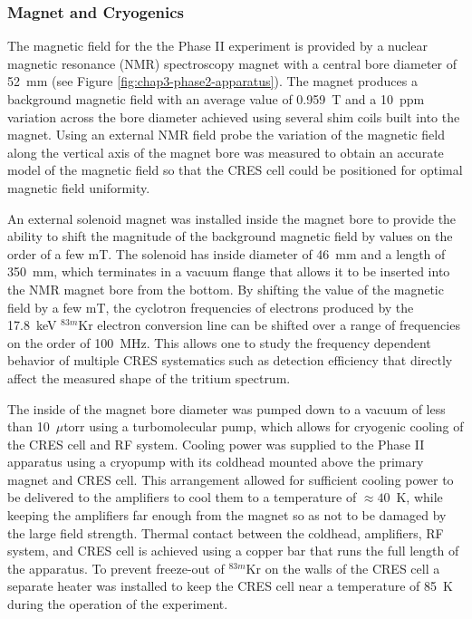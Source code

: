 \subsubsection*{Magnet and Cryogenics}

The magnetic field for the the Phase II experiment is provided by a nuclear magnetic resonance (NMR) spectroscopy magnet with a central bore diameter of 52~mm (see Figure \ref{fig:chap3-phase2-apparatus}). The magnet produces a background magnetic field with an average value of 0.959~T and a 10~ppm variation across the bore diameter achieved using several shim coils built into the magnet. Using an external NMR field probe the variation of the magnetic field along the vertical axis of the magnet bore was measured to obtain an accurate model of the magnetic field so that the CRES cell could be positioned for optimal magnetic field uniformity.

An external solenoid magnet was installed inside the magnet bore to provide the ability to shift the magnitude of the background magnetic field by values on the order of a few mT. The solenoid has inside diameter of 46~mm and a length of 350~mm, which terminates in a vacuum flange that allows it to be inserted into the NMR magnet bore from the bottom. By shifting the value of the magnetic field by a few mT, the cyclotron frequencies of electrons produced by the 17.8~keV $^{83m}$Kr electron conversion line can be shifted over a range of frequencies on the order of 100~MHz. This allows one to study the frequency dependent behavior of multiple CRES systematics such as detection efficiency that directly affect the measured shape of the tritium spectrum. 

The inside of the magnet bore diameter was pumped down to a vacuum of less than 10~$\mu$torr using a turbomolecular pump, which allows for cryogenic cooling of the CRES cell and RF system. Cooling power was supplied to the Phase II apparatus using a cryopump with its coldhead mounted above the primary magnet and CRES cell. This arrangement allowed for sufficient cooling power to be delivered to the amplifiers to cool them to a temperature of $\approx 40$~K, while keeping the amplifiers far enough from the magnet so as not to be damaged by the large field strength. Thermal contact between the coldhead, amplifiers, RF system, and CRES cell is achieved using a copper bar that runs the full length of the apparatus. To prevent freeze-out of $^{83m}$Kr on the walls of the CRES cell a separate heater was installed to keep the CRES cell near a temperature of 85~K during the operation of the experiment.

